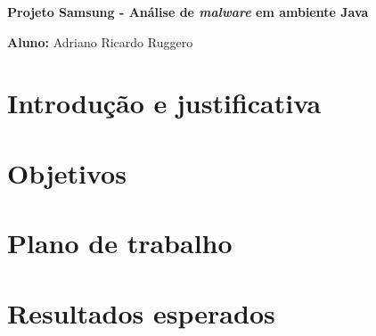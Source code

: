 \documentclass[12pt,twoside,a4paper]{article}
\begin{document}
\vskip 15mm

\begin{center} 
\textbf{Projeto Samsung - Análise de \textit{malware} em ambiente Java}

\end{center}

\vskip 5mm

\textbf{Aluno:} Adriano Ricardo Ruggero

\vskip 20mm

\begin{abstract}



\end{abstract}

\newpage
\pagestyle{plain}
\headheight 0.0cm
\headsep 0.0cm
\footskip 2.2cm

\section{Introdução e justificativa}
\label{sec:introduction}

\section{Objetivos}
\label{sec:objects}


\section{Plano de trabalho}
\label{sec:plan}


\section{Resultados esperados}
\label{sec:conclusions}


{}

\end{document}
